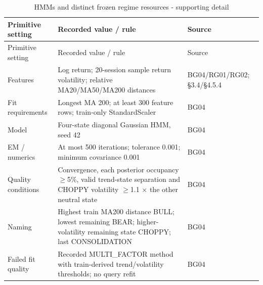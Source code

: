 \begin{longtable}[]{@{}
  >{\raggedright\arraybackslash}p{}
  >{\raggedright\arraybackslash}p{}
  >{\raggedright\arraybackslash}p{}@{}}
\caption{HMMs and distinct frozen regime resources - supporting detail}\label{tab:C_configuration:3}\tabularnewline
\toprule\noalign{}
Primitive setting
 & Recorded value / rule
 & Source
 \\
\midrule\noalign{}
\endfirsthead
\toprule\noalign{}
Primitive setting
 & Recorded value / rule
 & Source
 \\
\midrule\noalign{}
\endhead
\bottomrule\noalign{}
\endlastfoot
Features & Log return; 20-session sample return volatility; relative MA20/MA50/MA200 distances & BG04/RG01/RG02; §3.4/§4.5.4 \\
Fit requirements & Longest MA 200; at least 300 feature rows; train-only StandardScaler & BG04 \\
Model & Four-state diagonal Gaussian HMM, seed 42 & BG04 \\
EM / numerics & At most 500 iterations; tolerance 0.001; minimum covariance 0.001 & BG04 \\
Quality conditions & Convergence, each posterior occupancy \ensuremath{\geq}5\%, valid trend-state separation and CHOPPY volatility \ensuremath{\geq}1.1 \ensuremath{\times} the other neutral state & BG04 \\
Naming & Highest train MA200 distance BULL; lowest remaining BEAR; higher-volatility remaining state CHOPPY; last CONSOLIDATION & BG04 \\
Failed fit quality & Recorded MULTI\_\allowbreak{}FACTOR method with train-derived trend/volatility thresholds; no query refit & BG04 \\
\end{longtable}

\endgroup

\begingroup
\small
{}
\setlength{\tabcolsep}{3pt}


